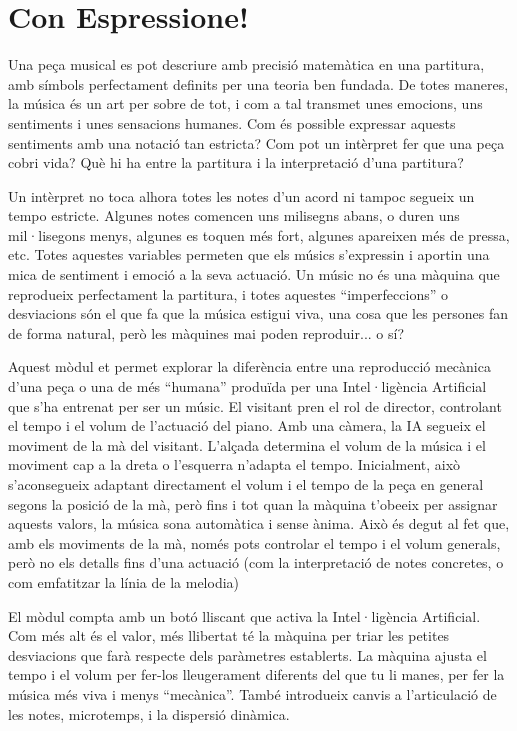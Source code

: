 \section{Con Espressione!}
Una peça musical es pot descriure amb precisió matemàtica en una partitura, amb símbols perfectament definits per una teoria ben fundada. De totes maneres, la música és un art per sobre de tot, i com a tal transmet unes emocions, uns sentiments i unes sensacions humanes. Com és possible expressar aquests sentiments amb una notació tan estricta? Com pot un intèrpret fer que una peça cobri vida? Què hi ha entre la partitura i la interpretació d'una partitura?

Un intèrpret no toca alhora totes les notes d'un acord ni tampoc segueix un tempo estricte. Algunes notes comencen uns milisegns abans, o duren uns mil·lisegons menys, algunes es toquen més fort, algunes apareixen més de pressa, etc. Totes aquestes variables permeten que els músics s'expressin i aportin una mica de sentiment i emoció a la seva actuació. Un músic no és una màquina que reprodueix perfectament la partitura, i totes aquestes ``imperfeccions'' o desviacions són el que fa que la música estigui viva, una cosa que les persones fan de forma natural, però les màquines mai poden reproduir... o sí?

Aquest mòdul et permet explorar la diferència entre una reproducció mecànica d'una peça o una de més ``humana'' produïda per una Intel·ligència Artificial que s'ha entrenat per ser un músic. El visitant pren el rol de director, controlant el tempo i el volum de l'actuació del piano. Amb una càmera, la IA segueix el moviment de la mà del visitant. L'alçada determina el volum de la música i el moviment cap a la dreta o l'esquerra n'adapta el tempo. Inicialment, això s'aconsegueix adaptant directament el volum i el tempo de la peça en general segons la posició de la mà, però fins i tot quan la màquina t'obeeix per assignar aquests valors, la música sona automàtica i sense ànima. Això és degut al fet que, amb els moviments de la mà, només pots controlar el tempo i el volum generals, però no els detalls fins d'una actuació (com la interpretació de notes concretes, o com emfatitzar la línia de la melodia)

El mòdul compta amb un botó lliscant que activa la Intel·ligència Artificial. Com més alt és el valor, més llibertat té la màquina per triar les petites desviacions que farà respecte dels paràmetres establerts. La màquina ajusta el tempo i el volum per fer-los lleugerament diferents del que tu li manes, per fer la música més viva i menys ``mecànica''. També introdueix canvis a l'articulació de les notes, microtemps, i la dispersió dinàmica.

